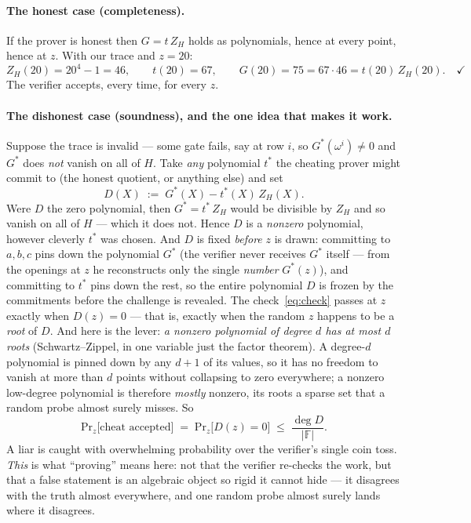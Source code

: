 \documentclass[11pt,a4paper]{article}
\theoremstyle{definition}
\newcommand{\F}{\mathbb{F}}
\renewcommand{\Pr}{\mathrm{Pr}}
\newcommand{\ZH}{Z_H}
\DeclareMathOperator{\degr}{deg}
\begin{document}
\paragraph{The honest case (completeness).} If the prover is honest then
$G = t\,\ZH$ holds as polynomials, hence at every point, hence at $z$. With our
trace and $z = 20$:
\[
\ZH(20) = 20^4 - 1 = 46, \qquad t(20) = 67, \qquad
G(20) = 75 = 67 \cdot 46 = t(20)\,\ZH(20). \quad\checkmark
\]
The verifier accepts, every time, for every $z$.

\paragraph{The dishonest case (soundness), and the one idea that makes it
work.} Suppose the trace is invalid --- some gate fails, say at row $i$, so
$G^{\!*}(\omega^i) \neq 0$ and $G^{\!*}$ does \emph{not} vanish on all of $H$.
Take \emph{any} polynomial $t^{\!*}$ the cheating prover might commit to (the
honest quotient, or anything else) and set
\[
D(X) \;:=\; G^{\!*}(X) - t^{\!*}(X)\,\ZH(X).
\]
Were $D$ the zero polynomial, then $G^{\!*} = t^{\!*}\,\ZH$ would be divisible
by $\ZH$ and so vanish on all of $H$ --- which it does not. Hence $D$ is a
\emph{nonzero} polynomial, however cleverly $t^{\!*}$ was chosen. And $D$ is
fixed \emph{before} $z$ is drawn: committing to $a, b, c$ pins down the
polynomial $G^{\!*}$ (the verifier never receives $G^{\!*}$ itself --- from the
openings at $z$ he reconstructs only the single \emph{number} $G^{\!*}(z)$),
and committing to $t^{\!*}$ pins down the rest, so the entire polynomial $D$ is
frozen by the commitments before the challenge is revealed. The
check~\eqref{eq:check} passes at $z$ exactly when $D(z) = 0$ --- that is,
exactly when the random $z$ happens to be a \emph{root} of $D$. And here is the
lever: \emph{a nonzero polynomial of degree $d$ has at most $d$ roots}
(Schwartz--Zippel, in one variable just the factor theorem). A degree-$d$
polynomial is pinned down by any $d + 1$ of its values, so it has no freedom to
vanish at more than $d$ points without collapsing to zero everywhere; a nonzero
low-degree polynomial is therefore \emph{mostly} nonzero, its roots a sparse
set that a random probe almost surely misses. So
\[
\Pr_{z}\bigl[\text{cheat accepted}\bigr] \;=\;
\Pr_{z}\bigl[D(z) = 0\bigr] \;\le\; \frac{\degr D}{|\F|}.
\]
A liar is caught with overwhelming probability over the verifier's single coin
toss. \emph{This} is what ``proving'' means here: not that the verifier
re-checks the work, but that a false statement is an algebraic object so rigid
it cannot hide --- it disagrees with the truth almost everywhere, and one
random probe almost surely lands where it disagrees.
\end{document}
